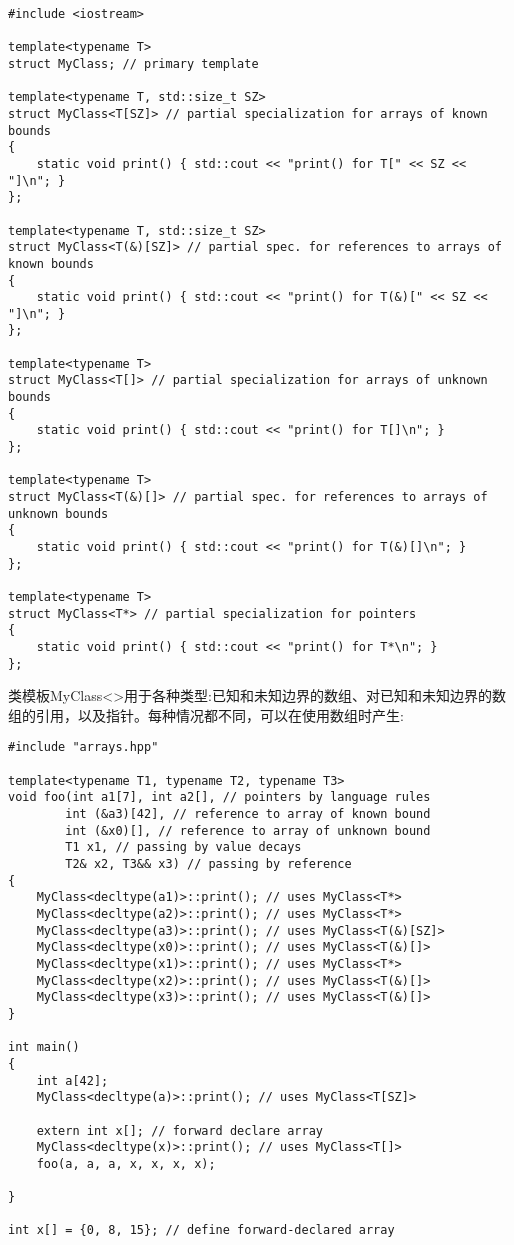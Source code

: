 \begin{lstlisting}[style=styleCXX]
#include <iostream>

template<typename T>
struct MyClass; // primary template

template<typename T, std::size_t SZ>
struct MyClass<T[SZ]> // partial specialization for arrays of known bounds
{
	static void print() { std::cout << "print() for T[" << SZ << "]\n"; }
};

template<typename T, std::size_t SZ>
struct MyClass<T(&)[SZ]> // partial spec. for references to arrays of known bounds
{
	static void print() { std::cout << "print() for T(&)[" << SZ << "]\n"; }
};

template<typename T>
struct MyClass<T[]> // partial specialization for arrays of unknown bounds
{
	static void print() { std::cout << "print() for T[]\n"; }
};

template<typename T>
struct MyClass<T(&)[]> // partial spec. for references to arrays of unknown bounds
{
	static void print() { std::cout << "print() for T(&)[]\n"; }
};

template<typename T>
struct MyClass<T*> // partial specialization for pointers
{
	static void print() { std::cout << "print() for T*\n"; }
};
\end{lstlisting}

类模板MyClass<>用于各种类型:已知和未知边界的数组、对已知和未知边界的数组的引用，以及指针。每种情况都不同，可以在使用数组时产生:

\begin{lstlisting}[style=styleCXX]
#include "arrays.hpp"

template<typename T1, typename T2, typename T3>
void foo(int a1[7], int a2[], // pointers by language rules
		int (&a3)[42], // reference to array of known bound
		int (&x0)[], // reference to array of unknown bound
		T1 x1, // passing by value decays
		T2& x2, T3&& x3) // passing by reference
{
	MyClass<decltype(a1)>::print(); // uses MyClass<T*>
	MyClass<decltype(a2)>::print(); // uses MyClass<T*>
	MyClass<decltype(a3)>::print(); // uses MyClass<T(&)[SZ]>
	MyClass<decltype(x0)>::print(); // uses MyClass<T(&)[]>
	MyClass<decltype(x1)>::print(); // uses MyClass<T*>
	MyClass<decltype(x2)>::print(); // uses MyClass<T(&)[]>
	MyClass<decltype(x3)>::print(); // uses MyClass<T(&)[]>
}

int main()
{
	int a[42];
	MyClass<decltype(a)>::print(); // uses MyClass<T[SZ]>
	
	extern int x[]; // forward declare array
	MyClass<decltype(x)>::print(); // uses MyClass<T[]>
	foo(a, a, a, x, x, x, x);
	
}

int x[] = {0, 8, 15}; // define forward-declared array
\end{lstlisting}

